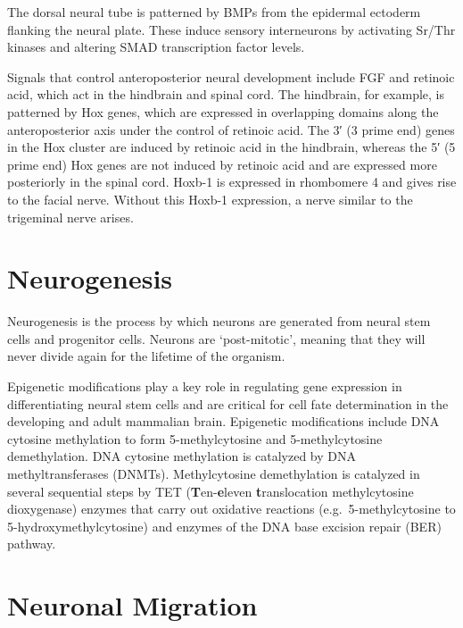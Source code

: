 The dorsal neural tube is patterned by BMPs from the epidermal ectoderm flanking the neural plate. These induce sensory interneurons by activating Sr/Thr kinases and altering SMAD transcription factor levels.

Signals that control anteroposterior neural development include FGF and retinoic acid, which act in the hindbrain and spinal cord. The hindbrain, for example, is patterned by Hox genes, which are expressed in overlapping domains along the anteroposterior axis under the control of retinoic acid. The 3′ (3 prime end) genes in the Hox cluster are induced by retinoic acid in the hindbrain, whereas the 5′ (5 prime end) Hox genes are not induced by retinoic acid and are expressed more posteriorly in the spinal cord. Hoxb-1 is expressed in rhombomere 4 and gives rise to the facial nerve. Without this Hoxb-1 expression, a nerve similar to the trigeminal nerve arises.

\hypertarget{neurogenesis}{%
\section{Neurogenesis}\label{neurogenesis}}

Neurogenesis is the process by which neurons are generated from neural stem cells and progenitor cells. Neurons are `post-mitotic', meaning that they will never divide again for the lifetime of the organism.

Epigenetic modifications play a key role in regulating gene expression in differentiating neural stem cells and are critical for cell fate determination in the developing and adult mammalian brain. Epigenetic modifications include DNA cytosine methylation to form 5-methylcytosine and 5-methylcytosine demethylation. DNA cytosine methylation is catalyzed by DNA methyltransferases (DNMTs). Methylcytosine demethylation is catalyzed in several sequential steps by TET (\textbf{T}en-\textbf{e}leven \textbf{t}ranslocation methylcytosine dioxygenase) enzymes that carry out oxidative reactions (e.g.~5-methylcytosine to 5-hydroxymethylcytosine) and enzymes of the DNA base excision repair (BER) pathway.

\hypertarget{neuronal-migration}{%
\section{Neuronal Migration}\label{neuronal-migration}}

